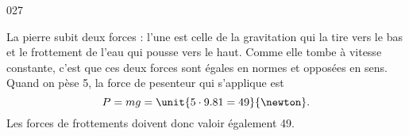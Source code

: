 \begin{corrige}{027}

La pierre subit deux forces : l'une est celle de la gravitation qui la tire vers le bas et le frottement de l'eau qui pousse vers le haut. Comme elle tombe à vitesse constante, c'est que ces deux forces sont égales en normes et opposées en sens. Quand on pèse \unit{5}{\kilo\gram}, la force de pesenteur qui s'applique est
\[ 
  P=mg= \unit{5\cdot 9.81=49}{\newton}.
\]
Les forces de frottements doivent donc valoir également \unit{49}{\newton}.
\end{corrige}


